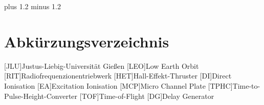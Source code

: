 \documentclass[fontsize=11pt,%
twoside,
BCOR          = 8mm]{scrreprt}
\author{Lorenz Saalmann}
\begin{document}
\noindent

\font plus 1.2\font
minus 1.2\font






\cleardoublepage

\tableofcontents
\cleardoublepage

\listoffigures
\listoftables
\chapter*{Abk\"{u}rzungsverzeichnis}
\begin{acronym}
[JLU]{\dotfill Justus-Liebig-Universit\"{a}t Gie{\ss}en}
[LEO]{\dotfill Low Earth Orbit}
[RIT]{\dotfill Radiofrequenzionentriebwerk}
[HET]{\dotfill Hall-Effekt-Thruster}
[DI]{\dotfill Direct Ionisation}
[EA]{\dotfill Excitation Ionisation}
[MCP]{\dotfill Micro Channel Plate}
[TPHC]{\dotfill Time-to-Pulse-Height-Converter}
[TOF]{\dotfill Time-of-Flight}
[DG]{\dotfill Delay Generator}

\end{acronym}
\cleardoublepage

\onehalfspacing

\cleardoublepage


\cleardoublepage

\cleardoublepage

\cleardoublepage

\cleardoublepage


\fontsize{12pt}{12pt}\selectfont

\renewcommand\bibname{Literaturverzeichnis}
\clearpage
{}
{}

\printbibliography
\end{document}
